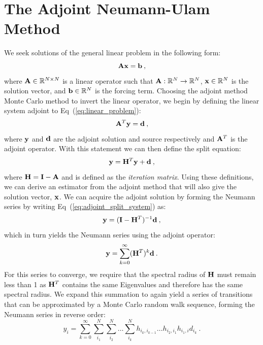 \documentclass[letterpaper,12pt]{article}
\begin{document}
\section{The Adjoint Neumann-Ulam Method}
We seek solutions of the general linear problem in the following form:
\begin{equation}
  \mathbf{A} \mathbf{x} = \mathbf{b}\:,
  \label{eq:linear_problem}
\end{equation}
where $\mathbf{A} \in \mathbb{R}^{N \times N}$ is a linear operator such
that $\mathbf{A} : \mathbb{R}^{N} \rightarrow \mathbb{R}^{N}$, $\mathbf{x} \in
\mathbb{R}^N$ is the solution vector, and $\mathbf{b} \in \mathbb{R}^N$ is
the forcing term. Choosing the adjoint method Monte Carlo method to
invert the linear operator, we begin by defining the linear system
adjoint to Eq~(\ref{eq:linear_problem}):
\begin{equation}
  \mathbf{A}^T \mathbf{y} = \mathbf{d}\:,
  \label{eq:adjoint_linear_problem}
\end{equation}
where $\mathbf{y}$ and $\mathbf{d}$ are the adjoint solution and source
respectively and $\mathbf{A}^T$ is the adjoint operator.  With this
statement we can then define the split equation:
\begin{equation}
  \mathbf{y} = \mathbf{H}^T \mathbf{y} + \mathbf{d}\:,
  \label{eq:adjoint_split_system}
\end{equation}
where $\mathbf{H} = \mathbf{I} - \mathbf{A}$ and is defined as the
\textit{iteration matrix}.  Using these definitions, we can derive an
estimator from the adjoint method that will also give the solution
vector, $\mathbf{x}$. We can acquire the adjoint solution by forming the
Neumann series by writing Eq~(\ref{eq:adjoint_split_system}) as:
\begin{equation}
  \mathbf{y} = (\mathbf{I} - \mathbf{H}^T)^{-1} \mathbf{d}\:,
  \label{eq:adjoint_split_system_2}
\end{equation}
which in turn yields the Neumann series using the adjoint operator:
\begin{equation}
  \mathbf{y} = \sum_{k=0}^{\infty} (\mathbf{H}^T)^k\mathbf{d}\:.
  \label{eq:adjoint_neumann_series}
\end{equation}
For this series to converge, we require that the spectral radius of
$\mathbf{H}$ must remain less than 1 as $\mathbf{H}^T$ contains the same
Eigenvalues and therefore has the same spectral radius. We expand this
summation to again yield a series of transitions that can be
approximated by a Monte Carlo random walk sequence, forming the
Neumann series in reverse order:
\begin{equation}
  y_i = \sum_{k=0}^{\infty}\sum_{i_1}^{N}\sum_{i_2}^{N}\ldots
  \sum_{i_k}^{N}h_{i_k,i_{k-1}}\ldots h_{i_2,i_1} h_{i_1,i} d_{i_k}\:.
  \label{eq:adjoint_neumann_solution}
\end{equation}
\end{document}
